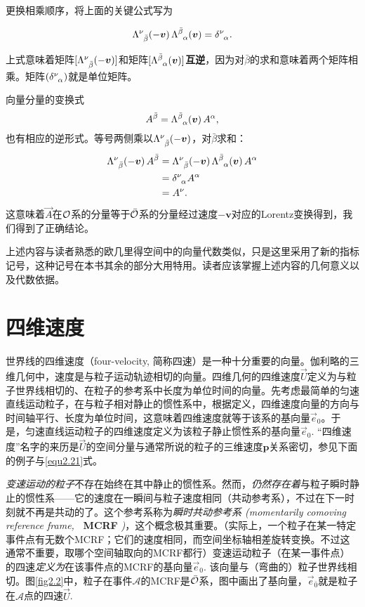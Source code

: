 更换相乘顺序，将上面的关键公式写为
\begin{shaded}
\begin{equation}
    \Lambda\indices{^\nu_{\bar{\beta}}} (-\bm{v}) \, \Lambda\indices{^{\bar{\beta}}_\alpha}(\bm{v}) = \delta\indices{^\nu_\alpha}.
\label{equ2.18}
\end{equation}
\end{shaded}
上式意味着矩阵$[\Lambda\indices{^\nu_{\bar{\beta}}} (-\bm{v})]$和矩阵$[\Lambda\indices{^{\bar{\beta}}_\alpha}(\bm{v})]$\textbf{互逆}，因为对$\bar{\beta}$的求和意味着两个矩阵相乘。矩阵$(\delta\indices{^\nu_\alpha})$就是单位矩阵。

向量分量的变换式
\[
    A^{\bar{\beta}} = \Lambda\indices{^{\bar{\beta}}_\alpha}(\bm{v}) \, A^\alpha,
\]
也有相应的逆形式。等号两侧乘以$\Lambda\indices{^\nu_{\bar{\beta}}} (-\bm{v})$，对$\bar{\beta}$求和：
\begin{align*}
    \Lambda\indices{^\nu_{\bar{\beta}}} (-\bm{v})  \, A^{\bar{\beta}} &= \Lambda\indices{^\nu_{\bar{\beta}}} (-\bm{v}) \, \Lambda\indices{^{\bar{\beta}}_\alpha}(\bm{v}) \, A^\alpha \\
    &= \delta\indices{^\nu_\alpha} A^\alpha \\
    &= A^\nu.
\end{align*}
这意味着$\vec{A}$在$\mathcal{O}$系的分量等于$\bar{\mathcal{O}}$系的分量经过速度$-\bm{v}$对应的Lorentz变换得到，我们得到了正确结论。

上述内容与读者熟悉的欧几里得空间中的向量代数类似，只是这里采用了新的指标记号，这种记号在本书其余的部分大用特用。读者应该掌握上述内容的几何意义以及代数依据。



\section{四维速度}
\label{sec2.3}
世界线的四维速度（four-velocity, 简称四速）是一种十分重要的向量。伽利略的三维几何中，速度是与粒子运动轨迹相切的向量。四维几何的四维速度$\vec{U}$定义为与粒子世界线相切的、在粒子的参考系中长度为单位时间的向量。先考虑最简单的匀速直线运动粒子，在与粒子相对静止的惯性系中，根据定义，四维速度向量的方向与时间轴平行、长度为单位时间，这意味着四维速度就等于该系的基向量$\vec{e}_0$。于是，匀速直线运动粒子的四维速度定义为该粒子静止惯性系的基向量$\vec{e}_0$. “四维速度”名字的来历是$\vec{U}$的空间分量与通常所说的粒子的三维速度$\bm{p}$关系密切，参见下面的例子与\eqref{equ2.21}式。


\textit{变速运动的粒子}不存在始终在其中静止的惯性系。然而，\textit{仍然存在着}与粒子瞬时静止的惯性系——它的速度在一瞬间与粒子速度相同（共动参考系），不过在下一时刻就不再是共动的了。这个参考系称为\textit{瞬时共动参考系 (momentarily comoving reference frame,} \textbf{\ MCRF} \textit{)}，这个概念极其重要。（实际上，一个粒子在某一特定事件点有无数个MCRF；它们的速度相同，而空间坐标轴相差旋转变换。不过这通常不重要，取哪个空间轴取向的MCRF都行）变速运动粒子（在某一事件点）的四速\textit{定义为}在该事件点的MCRF的基向量$\vec{e}_0$. 该向量与（弯曲的）粒子世界线相切。图\ref{fig2.2}中，粒子在事件$\mathscr{A}$的MCRF是$\bar{\mathcal{O}}$系，图中画出了基向量，$\vec{e}_{\bar{0}}$就是粒子在$\mathscr{A}$点的四速$\vec{U}$.

